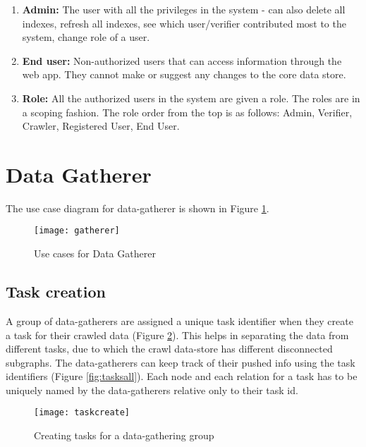 \begin{enumerate}
    \item \textbf{Admin:} The user with all the privileges in the system - can also delete all indexes, refresh all indexes, see which user/verifier contributed most to the system, change role of a user.

    \item \textbf{End user:} Non-authorized users that can access information through the web app. They cannot make or suggest any changes to the core data store.

    \item \textbf{Role:} All the authorized users in the system are given a role. The roles are in a scoping fashion. The role order from the top is as follows: Admin, Verifier, Crawler, Registered User, End User.  

\end{enumerate}




\section{Data Gatherer}

The use case diagram for data-gatherer is shown in Figure \ref{fig:gatherer}.

\begin{figure}[H]
\begin{center}  
\texttt{[image: gatherer]} 
\caption{Use cases for Data Gatherer}
\label{fig:gatherer}
\end{center}
\end{figure}


\subsection{Task creation}
A group of data-gatherers are assigned a unique task identifier when they create a task for their crawled data (Figure \ref{fig:taskcreate}). This helps in separating the data from different tasks, due to which the crawl data-store has different disconnected subgraphs. The data-gatherers can keep track of their pushed info using the task identifiers (Figure \ref{fig:tasksall}). Each node and each relation for a task has to be uniquely named by the data-gatherers relative only to their task id.


\begin{figure}[H]
\begin{center}  
\texttt{[image: taskcreate]} 
\caption{Creating tasks for a data-gathering group}
\label{fig:taskcreate}
\end{center}
\end{figure}


